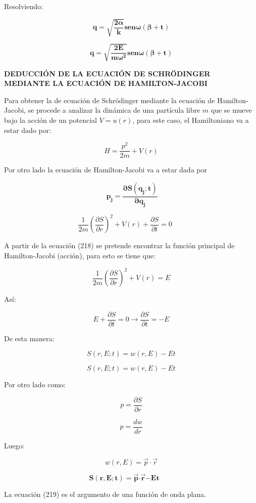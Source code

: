 \documentclass[]{article}
\begin{document}
Resolviendo:

\[\mathbf{q =}\sqrt{\frac{\mathbf{2}\mathbf{\alpha}}{\mathbf{k}}}\mathbf{sen}{\mathbf{\omega}\left( \mathbf{\beta + t} \right)}\]

\[\mathbf{q =}\sqrt{\frac{\mathbf{2}\mathbf{E}}{\mathbf{m}\mathbf{\omega}^{\mathbf{2}}}}\mathbf{sen}{\mathbf{\omega}\left( \mathbf{\beta + t} \right)}\]

\textbf{DEDUCCIÓN DE LA ECUACIÓN DE SCHRÖDINGER MEDIANTE LA ECUACIÓN DE
HAMILTON-JACOBI}

Para obtener la de ecuación de Schrödinger mediante la ecuación de
Hamilton-Jacobi, se procede a analizar la dinámica de una partícula
libre \(m\) que se mueve bajo la acción de un potencial \(V = u(r)\),
para este caso, el Hamiltoniano va a estar dado por:

\[H = \frac{p^{2}}{2m} + V(r)\]

Por otro lado la ecuación de Hamilton-Jacobi va a estar dada por

\[\mathbf{\ }\mathbf{p}_{\mathbf{j}}\mathbf{=}\frac{\mathbf{\partial S}\left( \mathbf{q}_{\mathbf{j}}\mathbf{;t} \right)}{\mathbf{\partial}\mathbf{q}_{\mathbf{j}}}\]

\[\frac{1}{2m}\left( \frac{\partial S}{\partial r} \right)^{2} + V(r) + \frac{\partial S}{\partial t} = 0\ \ \ \ \ \ \ \ \]

A partir de la ecuación (218) se pretende encontrar la función principal
de Hamilton-Jacobi (acción), para esto se tiene que:

\[\frac{1}{2m}\left( \frac{\partial S}{\partial r} \right)^{2} + V(r) = E\]

Así:

\[E + \frac{\partial S}{\partial t} = 0 \rightarrow \frac{\partial S}{\partial t} = - E\]

De esta manera:

\[S(r,E;t) = w(r,E) - Et\]

\[S(r,E;t) = w(r,E) - Et\]

Por otro lado como:

\[p = \frac{\partial S}{\partial r}\]

\[p = \frac{dw}{dr}\]

Luego:

\[w(r,E) = \overrightarrow{p} \cdot \overrightarrow{r}\]

\[\mathbf{S}\left( \mathbf{r,E;t} \right)\mathbf{=}\overrightarrow{\mathbf{p}}\mathbf{\cdot}\overrightarrow{\mathbf{r}}\mathbf{- Et\ \ \ \ \ \ \ \ \ }\]

La ecuación (219) es el argumento de una función de onda plana.
\end{document}
